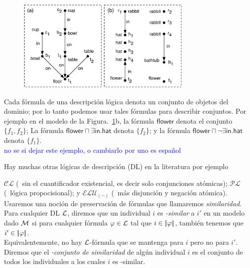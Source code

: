 \begin{figure}[t]
\begin{center}
\includegraphics[width=8.5cm]{figures/pic-dale-haddock.pdf}\\[0pt]
\caption{}
\label{fig:dale-haddock}
\end{center}
\end{figure}


Cada f\'ormula de una descripci\'on l\'ogica denota un conjunto de objetos del dominio; por lo tanto podemos usar tales f\'ormulas para describir conjuntos. Por ejemplo en el modelo de la Figura.~\ref{fig:dale-haddock}b, la f\'ormula
$\mathsf{flower}$ denota el conjunto $\{f_1,f_2\}$; La f\'ormula
$\mathsf{flower} \sqcap \exists \mathsf{in}.\mathsf{hat}$ denota
$\{f_2\}$; y la f\'ormula $\mathsf{flower} \sqcap \neg
\exists \mathsf{in}.\mathsf{hat}$ denota $\{f_1\}$.\\

\textcolor{blue}{no se si dejar este ejemplo, o cambiarlo por uno es espa\~nol}

Hay muchas otras l\'ogicas de descripci\'on (DL) en la literatura por ejemplo 

$\mathcal{CL}$ (\el\ sin el cuantificador existencial, es decir solo conjunciones at\'omicas); $\mathcal{PL}$ (\alc\ l\'ogica propocisional); y
$\mathcal{ELU}_{(\neg)}$ (\el\ m\'as disjunci\'on y negaci\'on at\'omica).\\

Usaremos una noci\'on de preservaci\'on de f\'ormulas que llamaremos
\emph{similaridad}. Para cualquier DL $\mathcal{L}$, diremos que un individual $i$ es \emph{\gL-similar} a $i'$ en un modelo dado $\mathcal{M}$
si para cualquier f\'ormula $\varphi \in \mathcal{L}$ tal que $i \in
|\!|\varphi|\!|$, tambi\'en tenemos que $i' \in |\!|\varphi|\!|$.\\
Equivalentemente, no hay $\mathcal{L}$-f\'ormula que se mantenga para $i$ pero no para
$i'$.  Diremos que el \emph{\gL-conjunto de similaridad} de alg\'un individual
$i$ es el conjunto de todos los individuales a los cuales $i$ es \gL-similar.\\

